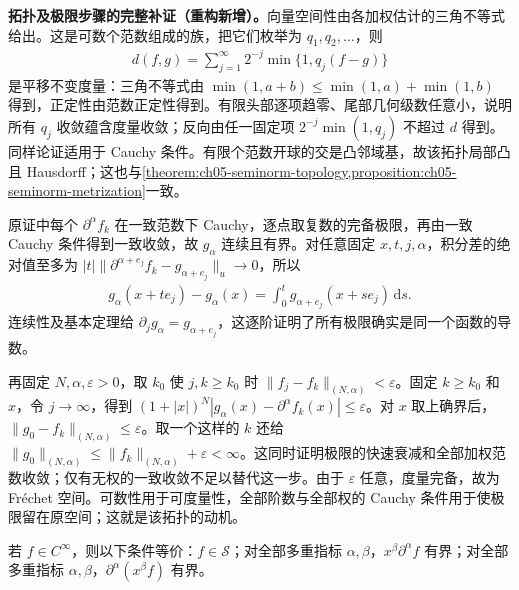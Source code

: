 \documentclass[../../main.tex]{subfiles}
\begin{document}
\begin{remark}
\textbf{拓扑及极限步骤的完整补证（重构新增）。}向量空间性由各加权估计的三角不等式给出。这是可数个范数组成的族，把它们枚举为 $q_1,q_2,\ldots$，则
\begin{align*}
d(f,g)=\sum_{j=1}^\infty2^{-j}\min\{1,q_j(f-g)\}
\end{align*}
是平移不变度量：三角不等式由 $\min(1,a+b)\leqslant\min(1,a)+\min(1,b)$ 得到，正定性由范数正定性得到。有限头部逐项趋零、尾部几何级数任意小，说明所有 $q_j$ 收敛蕴含度量收敛；反向由任一固定项 $2^{-j}\min(1,q_j)$ 不超过 $d$ 得到。同样论证适用于 Cauchy 条件。有限个范数开球的交是凸邻域基，故该拓扑局部凸且 Hausdorff；这也与\cref{theorem:ch05-seminorm-topology,proposition:ch05-seminorm-metrization}一致。

原证中每个 $\partial^\alpha f_k$ 在一致范数下 Cauchy，逐点取复数的完备极限，再由一致 Cauchy 条件得到一致收敛，故 $g_\alpha$ 连续且有界。对任意固定 $x,t,j,\alpha$，积分差的绝对值至多为
$|t|\|\partial^{\alpha+e_j}f_k-g_{\alpha+e_j}\|_u\to0$，所以
\begin{align*}
g_\alpha(x+te_j)-g_\alpha(x)=\int_0^t g_{\alpha+e_j}(x+se_j)\,\mathrm ds.
\end{align*}
连续性及基本定理给 $\partial_jg_\alpha=g_{\alpha+e_j}$，这逐阶证明了所有极限确实是同一个函数的导数。

再固定 $N,\alpha,\varepsilon>0$，取 $k_0$ 使 $j,k\geqslant k_0$ 时 $\|f_j-f_k\|_{(N,\alpha)}<\varepsilon$。固定 $k\geqslant k_0$ 和 $x$，令 $j\to\infty$，得到
$(1+|x|)^N|g_\alpha(x)-\partial^\alpha f_k(x)|\leqslant\varepsilon$。对 $x$ 取上确界后，$\|g_0-f_k\|_{(N,\alpha)}\leqslant\varepsilon$。取一个这样的 $k$ 还给 $\|g_0\|_{(N,\alpha)}\leqslant\|f_k\|_{(N,\alpha)}+\varepsilon<\infty$。这同时证明极限的快速衰减和全部加权范数收敛；仅有无权的一致收敛不足以替代这一步。由于 $\varepsilon$ 任意，度量完备，故为 Fréchet 空间。可数性用于可度量性，全部阶数与全部权的 Cauchy 条件用于使极限留在原空间；这就是该拓扑的动机。
\end{remark}
\begin{proposition}\label{proposition:ch08-schwartz-equivalences}
若 $f\in C^\infty$，则以下条件等价：$f\in\mathcal S$；对全部多重指标 $\alpha,\beta$，$x^\beta\partial^\alpha f$ 有界；对全部多重指标 $\alpha,\beta$，$\partial^\alpha(x^\beta f)$ 有界。
\end{proposition}
\end{document}
